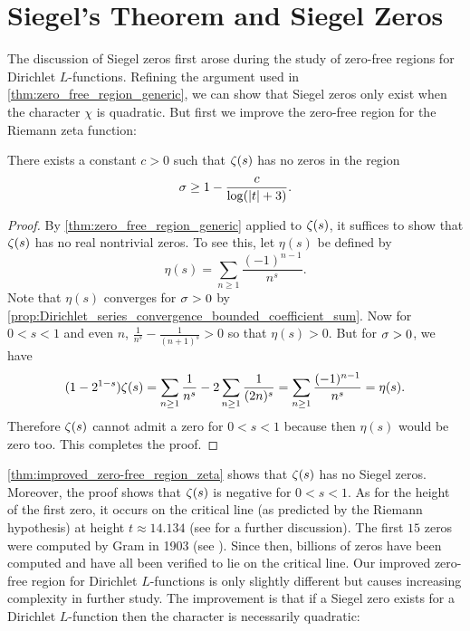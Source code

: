   \section{Siegel's Theorem and Siegel Zeros}
    The discussion of Siegel zeros first arose during the study of zero-free regions for Dirichlet $L$-functions. Refining the argument used in \cref{thm:zero_free_region_generic}, we can show that Siegel zeros only exist when the character $\chi$ is quadratic. But first we improve the zero-free region for the Riemann zeta function:

    \begin{theorem}\label{thm:improved_zero-free_region_zeta}
      There exists a constant $c > 0$ such that $\zeta(s)$ has no zeros in the region
      \[
        \sigma \ge 1-\frac{c}{\log(|t|+3)}.
      \]
    \end{theorem}
    \begin{proof}
      By \cref{thm:zero_free_region_generic} applied to $\zeta(s)$, it suffices to show that $\zeta(s)$ has no real nontrivial zeros. To see this, let $\eta(s)$ be defined by
      \[
        \eta(s) = \sum_{n \ge 1}\frac{(-1)^{n-1}}{n^{s}}.
      \]
      Note that $\eta(s)$ converges for $\sigma > 0$ by \cref{prop:Dirichlet_series_convergence_bounded_coefficient_sum}. Now for $0 < s < 1$ and even $n$, $\frac{1}{n^{s}}-\frac{1}{(n+1)^{s}} > 0$ so that $\eta(s) > 0$. But for $\sigma > 0$, we have
      \[
        (1-2^{1-s})\zeta(s) = \sum_{n \ge 1}\frac{1}{n^{s}}-2\sum_{n \ge 1}\frac{1}{(2n)^{s}} = \sum_{n \ge 1}\frac{(-1)^{n-1}}{n^{s}} = \eta(s).
      \]
      Therefore $\zeta(s)$ cannot admit a zero for $0 < s < 1$ because then $\eta(s)$ would be zero too. This completes the proof.
    \end{proof}

    \cref{thm:improved_zero-free_region_zeta} shows that $\zeta(s)$ has no Siegel zeros. Moreover, the proof shows that $\zeta(s)$ is negative for $0 < s < 1$. As for the height of the first zero, it occurs on the critical line (as predicted by the Riemann hypothesis) at height $t \approx 14.134$ (see \cite{davenport1980multiplicative} for a further discussion). The first $15$ zeros were computed by Gram in 1903 (see \cite{gram1903note}). Since then, billions of zeros have been computed and have all been verified to lie on the critical line. Our improved zero-free region for Dirichlet $L$-functions is only slightly different but causes increasing complexity in further study. The improvement is that if a Siegel zero exists for a Dirichlet $L$-function then the character is necessarily quadratic:

